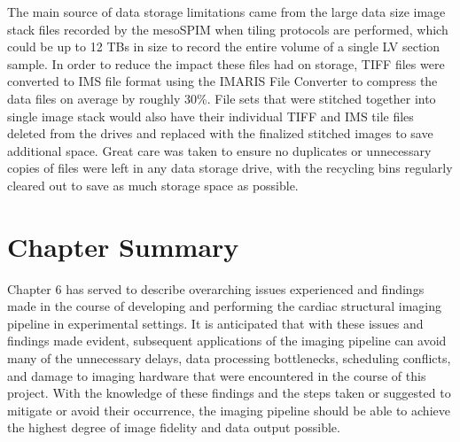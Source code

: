 The main source of data storage limitations came from the large data size image stack files recorded by the mesoSPIM when tiling protocols are performed, which could be up to 12 TBs in size to record the entire volume of a single LV section sample. In order to reduce the impact these files had on storage, TIFF files were converted to IMS file format using the IMARIS File Converter to compress the data files on average by roughly 30\%. File sets that were stitched together into single image stack would also have their individual TIFF and IMS tile files deleted from the drives and replaced with the finalized stitched images to save additional space. Great care was taken to ensure no duplicates or unnecessary copies of files were left in any data storage drive, with the recycling bins regularly cleared out to save as much storage space as possible.

\section{Chapter Summary}

Chapter 6 has served to describe overarching issues experienced and findings made in the course of developing and performing the cardiac structural imaging pipeline in experimental settings. It is anticipated that with these issues and findings made evident, subsequent applications of the imaging pipeline can avoid many of the unnecessary delays, data processing bottlenecks, scheduling conflicts, and damage to imaging hardware that were encountered in the course of this project. With the knowledge of these findings and the steps taken or suggested to mitigate or avoid their occurrence, the imaging pipeline should be able to achieve the highest degree of image fidelity and data output possible.



